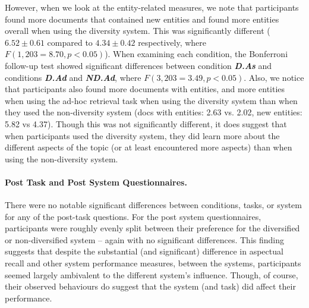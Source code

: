 However, when we look at the entity-related measures, we note that participants found more documents that contained new entities and found more entities overall when using the diversity system. This was significantly different ($6.52\pm0.61$ compared to $4.34\pm0.42$ respectively, where $F(1, 203=8.70, p<0.05)$). When examining each condition, the Bonferroni follow-up test showed significant differences between condition \textbf{\emph{D.As}} and conditions \textbf{\emph{D.Ad}} and \textbf{\emph{ND.Ad}}, where $F(3, 203=3.49, p<0.05)$. Also, we notice that participants also found more documents with entities, and more entities when using the ad-hoc retrieval task when using the diversity system than when they used the non-diversity system (docs with entities: 2.63 vs. 2.02, new entities: 5.82 vs 4.37). Though this was not significantly different, it does suggest that when participants used the diversity system, they did learn more about the different aspects of the topic (or at least encountered more aspects) than when using the non-diversity system. 

\paragraph{Post Task and Post System Questionnaires.} There were no notable significant differences between conditions, tasks, or system for any of the post-task questions. For the post system questionnaires, participants were roughly evenly split between their preference for the diversified or non-diversified system -- again with no significant differences. This finding suggests that despite the substantial (and significant) difference in aspectual recall and other system performance measures, between the systems, participants seemed largely ambivalent to the different system's influence. Though, of course, their observed behaviours do suggest that the system (and task) did affect their performance.

